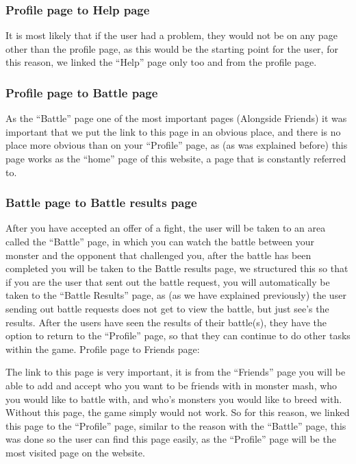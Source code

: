 \documentclass{project}
\begin{document}
\subsubsection{Profile page to Help page}

It is most likely that if the user had a problem, they would not be on any page other than the profile page, as this would be the starting point for the user, for this reason, we linked the “Help” page only too and from the profile page.

\subsubsection{Profile page to Battle page}

As the “Battle” page one of the most important pages (Alongside Friends) it was important that we put the link to this page in an obvious place, and there is no place more obvious than on your “Profile” page, as (as was explained before) this page works as the “home” page of this website, a page that is constantly referred to.

\subsubsection{Battle page to Battle results page}

After you have accepted an offer of a fight, the user will be taken to an area called the “Battle” page, in which you can watch the battle between your monster and the opponent that challenged you, after the battle has been completed you will be taken to the Battle results page, we structured this so that if you are the user that sent out the battle request, you will automatically be taken to the “Battle Results” page, as (as we have explained previously) the user sending out battle requests does not get to view the battle, but just see’s the results. After the users have seen the results of their battle(s), they have the option to return to the “Profile” page, so that they can continue to do other tasks within the game.
Profile page to Friends page:

The link to this page is very important, it is from the “Friends” page you will be able to add and accept who you want to be friends with in monster mash, who you would like to battle with, and who’s monsters you would like to breed with. Without this page, the game simply would not work. So for this reason, we linked this page to the “Profile” page, similar to the reason with the “Battle” page, this was done so the user can find this page easily, as the “Profile” page will be the most visited page on the website.
\end{document}
